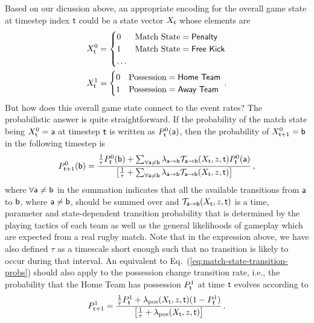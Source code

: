 Based on our dicussion above, an appropriate encoding for the overall game state at timestep index ${\sf t}$ could be a state vector $X_{{\sf t}}$ whose elements are
\begin{align}
X^0_{{\sf t}}&=\begin{cases} 0 & \text{Match State} = \text{{\sf Penalty}}\\ 1 & \text{Match State} = \text{{\sf Free Kick}} \\ \dots & \end{cases} \\
X^1_{{\sf t}}&=\begin{cases} 0 & \text{Possession} = \text{{\sf Home Team}}\\ 1 & \text{Possession} = \text{{\sf Away Team}} \end{cases} \,.
\end{align}
But how does this overall game state connect to the event rates? The probabilistic answer is quite straightforward. If the probability of the match state being $X^0_{{\sf t}}={\sf a}$ at timestep ${\sf t}$ is written as $P^0_{{\sf t}}({\sf a})$, then the probability of $X^0_{{\sf t}+1}={\sf b}$ in the following timestep is
\begin{align}
P^0_{{\sf t}+1}({\sf b}) = \frac{\frac{1}{\tau}P^0_{{\sf t}}({\sf b})+\sum_{\forall {\sf a}\neq {\sf b}}\lambda_{{\sf a}\rightarrow {\sf b}}{\cal T}_{{\sf a}\rightarrow {\sf b}}(X_{\sf t}, z, {\sf t})P^0_{{\sf t}}({\sf a})}{\big[ \frac{1}{\tau} + \sum_{\forall {\sf a}\neq {\sf b}}\lambda_{{\sf a}\rightarrow {\sf b}} {\cal T}_{{\sf a}\rightarrow {\sf b}}(X_{\sf t}, z, {\sf t})\big]} \label{eq:match-state-transition-probs}\,,
\end{align}
where $\forall {\sf a} \neq {\sf b}$ in the summation indicates that all the available transitions from ${\sf a}$ to ${\sf b}$, where ${\sf a}\neq {\sf b}$, should be summed over and ${\cal T}_{{\sf a}\rightarrow {\sf b}}(X_{\sf t}, z, {\sf t})$ is a time, parameter and state-dependent transition probability that is determined by the playing tactics of each team as well as the general likelihoods of gameplay which are expected from a real rugby match. Note that in the expression above, we have also defined $\tau$ as a timescale short enough such that no transition is likely to occur during that interval. An equivalent to Eq.~(\ref{eq:match-state-transition-probs}) should also apply to the possession change transition rate, i.e., the probability that the {\sf Home Team} has possession $P^1_{{\sf t}}$ at time ${\sf t}$ evolves according to
\begin{align}
P^1_{{\sf t}+1} = \frac{ \frac{1}{\tau}P^1_{{\sf t}} + \lambda_{\rm pos}(X_{\sf t}, z, {\sf t}) (1-P^1_{{\sf t}})}{\big[ \frac{1}{\tau} + \lambda_{\rm pos}(X_{\sf t}, z, {\sf t})\big]} \label{eq:possession-change-probs}\,.
\end{align}

